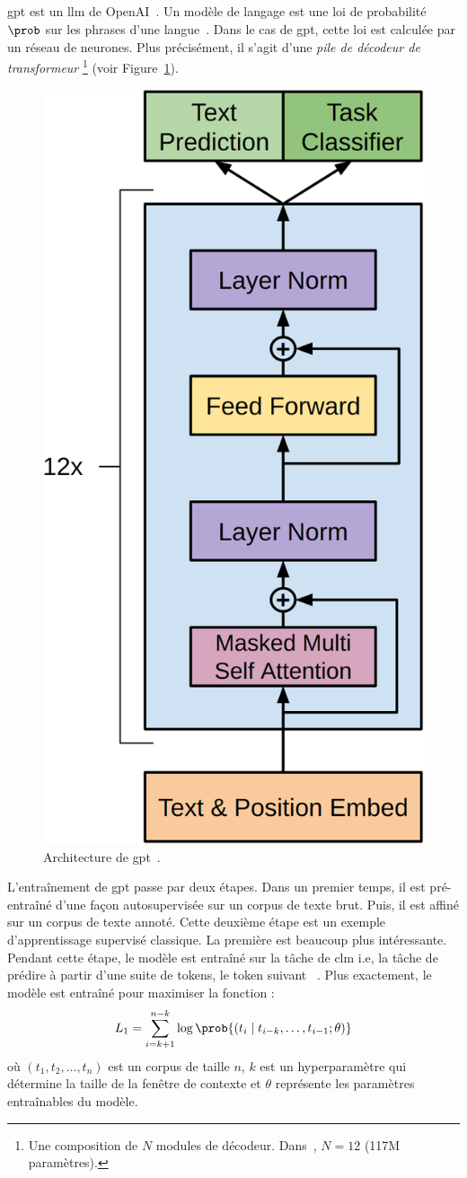 \subsection{}

\Gls{gpt} est un \gls{llm} de OpenAI~\cite{Radford_Narasimhan_Salimans_Sutskever}.
Un modèle de langage est une loi de probabilité \(\prob\) sur les phrases d'une langue~\cite{routledge}.
Dans le cas de \gls{gpt}, cette loi est calculée par un réseau de neurones.
Plus précisément, il s'agit d'une \emph{pile de décodeur de transformeur}%
\footnote{%
    Une composition de \(N\) modules de décodeur. 
    Dans~\cite{Radford_Narasimhan_Salimans_Sutskever}, \(N=12\)
    (117M paramètres).
} (voir Figure~\ref{fig.gpt}).

\begin{figure}[hbt]
    \centering
    \includegraphics[height=.5\linewidth]{assets/images/gpt.png}
    \caption[Architecture de \gls{gpt}.]%
    {Architecture de \gls{gpt}~\cite{Radford_Narasimhan_Salimans_Sutskever}.}
    \label{fig.gpt}
\end{figure}

L'entraînement de \gls{gpt} passe par deux étapes.
Dans un premier temps, il est pré-entraîné d'une façon autosupervisée sur un corpus de texte brut.
Puis, il est affiné sur un corpus de texte annoté.
Cette deuxième étape est un exemple d'apprentissage supervisé classique.
La première est beaucoup plus intéressante.
Pendant cette étape, le modèle est entraîné sur la tâche de \gls{clm}
i.e, la tâche de prédire à partir d'une suite de tokens, le token suivant%
~\cite{Radford_Narasimhan_Salimans_Sutskever}.
Plus exactement, le modèle est entraîné pour maximiser la fonction :
\begin{equation}
    \label{eq.gpt-pretrain-loss}
    L_1=\sum_{i=k+1}^{n-k} \log\prob{\left(t_i \mid t_{i-k}, \ldots, t_{i-1} ; \theta\right)}
\end{equation}
où \(\left(t_1, t_2, \ldots, t_n\right)\) est un corpus de taille \(n\), 
\(k\) est un hyperparamètre qui détermine la taille de la fenêtre de contexte
et \(\theta\) représente les paramètres entraînables du modèle.

